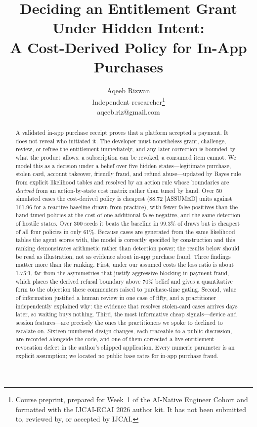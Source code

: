 \documentclass{article}
\title{Deciding an Entitlement Grant Under Hidden Intent:\\
A Cost-Derived Policy for In-App Purchases}
\author{
Aqeeb Rizwan\\
\affiliations Independent researcher\footnote{Course preprint, prepared for Week~1 of the AI-Native Engineer Cohort and formatted with the IJCAI-ECAI 2026 author kit. It has not been submitted to, reviewed by, or accepted by IJCAI.}\\
\emails aqeeb.riz@gmail.com
}
\begin{document}
\maketitle

\begin{abstract}
A validated in-app purchase receipt proves that a platform accepted a payment. It does
not reveal who initiated it. The developer must nonetheless grant, challenge, review, or
refuse the entitlement immediately, and any later correction is bounded by what the
product allows: a subscription can be revoked, a consumed item cannot. We model this as a
decision under a belief over five hidden states---legitimate purchase, stolen card,
account takeover, friendly fraud, and refund abuse---updated by Bayes rule from explicit
likelihood tables and resolved by an action rule whose boundaries are \emph{derived} from
an action-by-state cost matrix rather than tuned by hand. Over 50 simulated cases the
cost-derived policy is cheapest (88.72 [ASSUMED] units against 161.96 for a reactive
baseline drawn from practice), with fewer false positives than the hand-tuned policies at
the cost of one additional false negative, and the same detection of hostile states. Over
300 seeds it beats the baseline in 99.3\% of draws but is cheapest of all four policies in
only 61\%. Because cases are generated from the same likelihood tables the agent scores
with, the model is correctly specified by construction and this ranking demonstrates
arithmetic rather than detection power; the results below should be read as illustration,
not as evidence about in-app purchase fraud. Three findings matter more than the ranking. First, under our assumed costs the loss ratio
is about 1.75:1, far from the asymmetries that justify aggressive blocking in payment
fraud, which places the derived refusal boundary above 70\% belief and gives a quantitative
form to the objection these commenters raised to purchase-time gating. Second, value of
information justified a human review in one case of fifty, and a practitioner independently
explained why: the evidence that resolves stolen-card cases arrives days later, so waiting
buys nothing. Third, the most informative cheap signals---device and session
features---are precisely the ones the practitioners we spoke to declined to escalate on. Sixteen numbered design
changes, each traceable to a public discussion, are recorded alongside the code, and one
of them corrected a live entitlement-revocation defect in the author's shipped
application. Every numeric parameter is an explicit assumption; we located no public base
rates for in-app purchase fraud.
\end{abstract}
\end{document}
